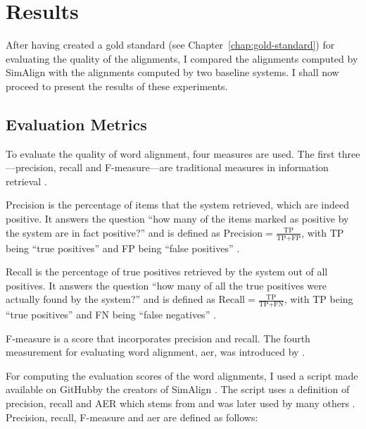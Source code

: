 \chapter{Results}\label{chap:results}

After having created a gold standard (see Chapter~\ref{chap:gold-standard}) for evaluating the quality of the alignments, I compared the alignments computed by SimAlign with the alignments computed by two baseline systems.
I shall now proceed to present the results of these experiments.

\section{Evaluation Metrics}
\label{sec:evaluation-metrics}
To evaluate the quality of word alignment, four measures are used. 
The first three---precision, recall and F-measure---are traditional measures in information retrieval \autocite{mihalcea-pedersen-2003-evaluation}.

Precision is the percentage of items that the system retrieved, which are indeed positive.
It answers the question \enquote{how many of the items marked as positive by the system are in fact positive?} and is defined as $\text{Precision}=\frac{\text{TP}}{\text{TP}+\text{FP}}$, with TP being \enquote{true positives} and FP being \enquote{false positives} \autocite[67]{jurafsky-2019}.

Recall is the percentage of true positives retrieved by the system out of all positives.
It answers the question \enquote{how many of all the true positives were actually found by the system?} and is defined as $\text{Recall}=\frac{\text{TP}}{\text{TP}+\text{FN}}$, with TP being \enquote{true positives} and FN being \enquote{false negatives} \autocite[67]{jurafsky-2019}.

F-measure is a score that incorporates precision and recall. 
The fourth measurement for evaluating word alignment, \acrfull{aer}, was introduced by \textcite{och-ney-2000-improved}. 

For computing the evaluation scores of the word alignments, I used a script made available on GitHub\footnotemark by the creators of SimAlign \autocite{jalili-sabet-etal-2020-simalign}. 
The script uses a definition of precision, recall and AER which stems from \textcite{och-ney-2000-improved} and was later used by many others \autocites{mihalcea-pedersen-2003-evaluation,och-ney-2003-systematic,Ostling2016efmaral,jalili-sabet-etal-2020-simalign}. Precision, recall, F-measure and \acrshort{aer} are defined as follows:

